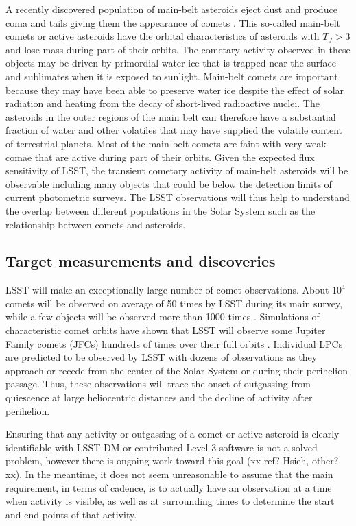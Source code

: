 A recently discovered population of main-belt asteroids eject
dust and produce coma and tails giving them the appearance of
comets \citep{2012AJ....143...66J}.  This so-called main-belt
comets or active asteroids have the orbital characteristics of
asteroids with $T_J > 3$ and lose mass during part of their
orbits. The cometary activity observed in these objects may be
driven by primordial water ice that is trapped near the
surface and sublimates when it is exposed to sunlight.
Main-belt comets are important because they may have been able to
preserve water ice despite the effect of solar radiation and
heating from the decay of short-lived radioactive nuclei.  The
asteroids in the outer regions of the main belt can therefore
have a substantial fraction of water and other volatiles that
may have supplied the volatile content of terrestrial planets.
Most of the main-belt-comets are faint with very weak comae
that are active during part of their orbits. Given the
expected flux sensitivity of LSST, the transient cometary
activity of main-belt asteroids will be observable including
many objects that could be below the detection limits of
current photometric surveys.  The LSST observations will thus
help to understand the overlap between different populations
in the Solar System such as the relationship between comets
and asteroids.


\subsection{Target measurements and discoveries}
\label{sec:\secname:targets}

LSST will make an exceptionally large number of comet
observations.  About $10^4$ comets will be observed on average
of 50 times by LSST during its main survey, while a few objects
will be observed more than 1000 times
\citep{2010PhDT.......241S}.  Simulations of characteristic
comet orbits have shown that LSST will observe some Jupiter
Family comets (JFCs) hundreds of times over their full orbits
\citep{2010PhDT.......241S}.  Individual LPCs are predicted to
be observed by LSST with dozens of observations as they
approach or recede from the center of the Solar System or
during their perihelion passage.  Thus, these observations
will trace the onset of outgassing from quiescence at large
heliocentric distances and the decline of activity after
perihelion.

Ensuring that any activity or outgassing of a comet or active asteroid
is clearly identifiable with LSST DM or contributed Level 3 software is not a
solved problem, however there is ongoing work toward this goal (xx
ref? Hsieh, other? xx). In the meantime, it does not seem unreasonable
to assume that the main requirement, in terms of cadence, is to actually
have an observation at a time when activity is visible, as well as at
surrounding times to determine the start and end points of that activity.

